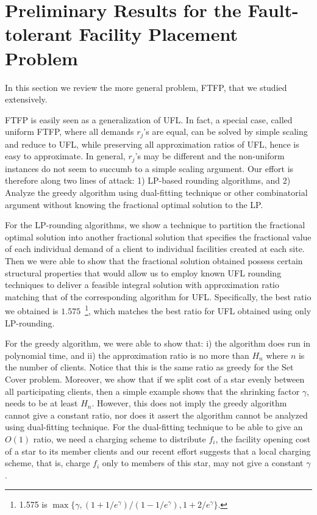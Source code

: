 \documentclass[11pt]{article}
\begin{document}
\section{Preliminary Results for the Fault-tolerant Facility Placement
  Problem}
In this section we review the more general problem, FTFP, that we
studied extensively.

FTFP is easily seen as a generalization of UFL. In fact, a special
case, called uniform FTFP, where all demands $r_j$'s are equal, can be
solved by simple scaling and reduce to UFL, while preserving all
approximation ratios of UFL, hence is easy to approximate. In general,
$r_j$'s may be different and the non-uniform instances do not seem to
succumb to a simple scaling argument. Our effort is therefore along
two lines of attack: 1) LP-based rounding algorithms, and 2) Analyze
the greedy algorithm using dual-fitting technique or other
combinatorial argument without knowing the fractional optimal solution
to the LP.

For the LP-rounding algorithms, we show a technique to partition the
fractional optimal solution into another fractional solution that
specifies the fractional value of each individual demand of a client
to individual facilities created at each site. Then we were able to
show that the fractional solution obtained possess certain structural
properties that would allow us to employ known UFL rounding techniques
to deliver a feasible integral solution with approximation ratio
matching that of the corresponding algorithm for UFL. Specifically,
the best ratio we obtained is $1.575$~\footnote{1.575 is
  $\max\{\gamma, (1+1/e^\gamma)/(1-1/e^\gamma), 1+2/e^\gamma\}$.},
which matches the best ratio for UFL obtained using only LP-rounding.

For the greedy algorithm, we were able to show that: i) the algorithm does
run in polynomial time, and ii) the approximation ratio is no more
than $H_n$ where $n$ is the number of clients. Notice that this is the
same ratio as greedy for the Set Cover problem. Moreover, we show that
if we split cost of a star evenly between all participating clients,
then a simple example shows that the shrinking factor $\gamma$, needs
to be at least $H_n$. However, this does not imply the greedy
algorithm cannot give a constant ratio, nor does it assert the
algorithm cannot be analyzed using dual-fitting technique. For the
dual-fitting technique to be able to give an $O(1)$ ratio, we need a
charging scheme to distribute $f_i$, the facility opening cost of a
star to its member clients and our recent effort suggests that a local
charging scheme, that is, charge $f_i$ only to members of this star,
may not give a constant $\gamma$.
\end{document}
